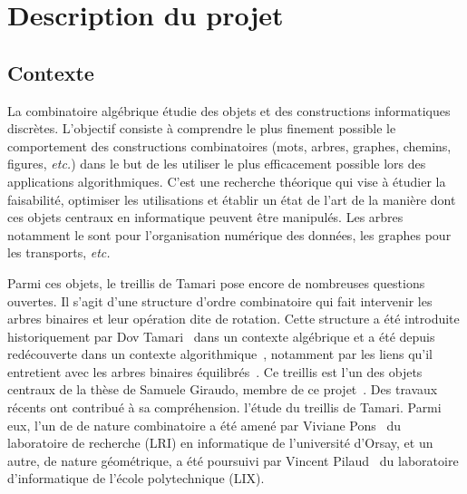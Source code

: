 \documentclass[a4paper, 10pt]{article}
\numberwithin{equation}{subsection}
\begin{document}
\section{Description du projet}



\subsection{Contexte}
La combinatoire algébrique étudie des objets et des constructions
informatiques discrètes. L'objectif consiste à comprendre le plus
finement possible le comportement des constructions combinatoires
(mots, arbres, graphes, chemins, figures, {\em etc.}) dans le but de
les utiliser le plus efficacement possible lors des applications
algorithmiques. C'est une recherche théorique qui vise à étudier la
faisabilité, optimiser les utilisations et établir un état de l'art de
la manière dont ces objets centraux en informatique peuvent être
manipulés. Les arbres notamment le sont pour l'organisation numérique
des données, les graphes pour les transports, {\em etc.}
\medbreak

Parmi ces objets, le treillis de Tamari pose encore de nombreuses
questions ouvertes. Il s'agit d'une structure d'ordre combinatoire qui
fait intervenir les arbres binaires et leur opération dite de rotation.
Cette structure a été introduite historiquement par Dov
Tamari~\cite{Tam62} dans un contexte algébrique et a été depuis
redécouverte dans un contexte algorithmique~\cite{Knu98}, notamment
par les liens qu'il entretient avec les arbres binaires
équilibrés~\cite{AVL62}. Ce treillis est l'un des objets centraux de la
thèse de Samuele Giraudo, membre de ce projet~\cite{MR2887627}. Des
travaux récents ont contribué à sa compréhension. l'étude du treillis
de Tamari. Parmi eux, l'un de de nature combinatoire a été amené par
Viviane Pons~\cite{MR3345297} du laboratoire de recherche (LRI) en
informatique de l'université d'Orsay, et un autre, de nature
géométrique, a été poursuivi par Vincent Pilaud~\cite{MR3327085} du
laboratoire d'informatique de l'école polytechnique (LIX).
\medbreak
\end{document}
